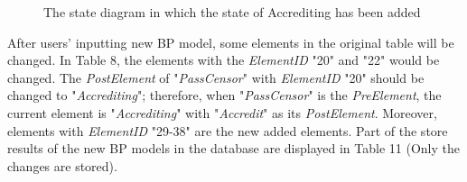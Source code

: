 \documentclass{elsarticle}
\begin{document}
  \begin{figure}[!t]
    \centering
    \scalebox{0.7}{\texttt{[image: 06]}}
    \caption{ The state diagram in which the state of Accrediting has been added }
  \end{figure}

\textrm{After users' inputting new BP model, some
elements in the original table will be changed. In Table 8, the
elements with the }\textrm{\textit{ElementID}}\textrm{
"20" and "22"
would be changed. The }\textrm{\textit{PostElement}}\textrm{ of
"}\textrm{\textit{PassCensor}}\textrm{"
with }\textrm{\textit{ElementID}}\textrm{
"20" should be changed to
"}\textrm{\textit{Accrediting}}\textrm{";
therefore, when
"}\textrm{\textit{PassCensor}}\textrm{" is
the }\textrm{\textit{PreElement}}\textrm{, the current element is
"}\textrm{\textit{Accrediting}}\textrm{"
with "}\textrm{\textit{Accredit}}\textrm{"
as its }\textrm{\textit{PostElement}}\textrm{. Moreover, elements with
}\textrm{\textit{ElementID}}\textrm{
"29-38" are the new added elements. Part of
the store results of the new BP models in the database are displayed in
Table 11 (Only the changes are stored).}
\end{document}
